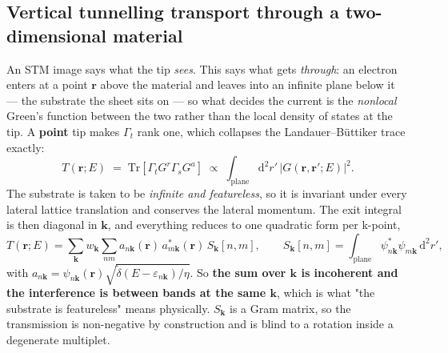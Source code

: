 \documentclass[11pt,a4paper]{article}
\begin{document}
\subsection{Vertical tunnelling transport through a two-dimensional material}

An STM image says what the tip \emph{sees}. This says what gets
\emph{through}: an electron enters at a point $\mathbf r$ above the material
and leaves into an infinite plane below it --- the substrate the sheet sits on
--- so what decides the current is the \emph{nonlocal} Green's function between
the two rather than the local density of states at the tip. A \textbf{point}
tip makes $\Gamma_t$ rank one, which collapses the Landauer--B\"uttiker trace
exactly:
\begin{equation*}
  T(\mathbf r; E) \;=\; \mathrm{Tr}\!\left[\Gamma_t G^r \Gamma_s G^a\right]
  \;\propto\; \int_{\mathrm{plane}}\! \mathrm{d}^2 r'\,
  \bigl|G(\mathbf r, \mathbf r'; E)\bigr|^2 .
\end{equation*}
The substrate is taken to be \emph{infinite and featureless}, so it is
invariant under every lateral lattice translation and conserves the lateral
momentum. The exit integral is then diagonal in $\mathbf k$, and everything
reduces to one quadratic form per k-point,
\begin{equation*}
  T(\mathbf r; E) = \sum_{\mathbf k} w_{\mathbf k}
    \sum_{nm} a_{n\mathbf k}(\mathbf r)\, a^{*}_{m\mathbf k}(\mathbf r)\,
    S_{\mathbf k}[n,m],
  \qquad
  S_{\mathbf k}[n,m] = \int_{\mathrm{plane}} \psi^{*}_{n\mathbf k}
     \psi_{m\mathbf k}\, \mathrm{d}^2 r' ,
\end{equation*}
with $a_{n\mathbf k} = \psi_{n\mathbf k}(\mathbf r)
\sqrt{\tilde\delta(E - \varepsilon_{n\mathbf k})/\eta}$. So \textbf{the sum
over $\mathbf k$ is incoherent and the interference is between bands at the
same $\mathbf k$}, which is what "the substrate is featureless" means
physically. $S_{\mathbf k}$ is a Gram matrix, so the transmission is
non-negative by construction and is blind to a rotation inside a degenerate
multiplet.
\end{document}
